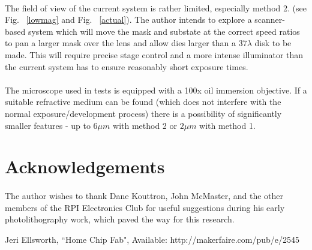 \documentclass[twocolumn]{article}
\begin{document}
\paragraph*{}
The field of view of the current system is rather limited, especially method 2. (see Fig. ~\ref{lowmag} and Fig.
~\ref{actual}). The author intends to explore a scanner- based system which will move the mask and substate at the
correct speed ratios to pan a larger mask over the lens and allow dies larger than a $37 \lambda$ disk to be made. This
will require precise stage control and a more intense illuminator than the current system has to ensure reasonably short
exposure times.

\paragraph*{}
The microscope used in tests is equipped with a 100x oil immersion objective. If a suitable refractive medium can be
found (which does not interfere with the normal exposure/development process) there is a possibility of significantly
smaller features - up to $6 \mu m$ with method 2 or $2 \mu m$ with method 1.

\section{Acknowledgements}
\paragraph*{}
The author wishes to thank Dane Kouttron, John McMaster, and the other members of the RPI Electronics Club for useful
suggestions during his early photolithography work, which paved the way for this research.

\begin{thebibliography}{99}
	Jeri Ellsworth, ``Home Chip Fab", Available: http://makerfaire.com/pub/e/2545

\end{thebibliography} 
\end{document}
